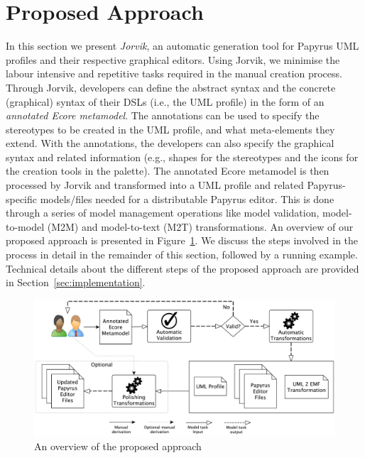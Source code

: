 \section{Proposed Approach}
\label{sec:approach}
In this section we present \textit{Jorvik}, an automatic generation tool for Papyrus UML profiles and their respective graphical editors.
Using Jorvik, we minimise the labour intensive and repetitive tasks required in the manual creation process.
Through Jorvik, developers can define the abstract syntax and the concrete (graphical) syntax of their DSLs (i.e., the UML profile) in the form of an \textit{annotated Ecore metamodel}.
The annotations can be used to specify the stereotypes to be created in the UML profile, and what meta-elements they extend. 
With the annotations, the developers can also specify the graphical syntax and related information (e.g., shapes for the stereotypes and the icons for the creation tools in the palette). 
The annotated Ecore metamodel is then processed by Jorvik and transformed into a UML profile and related Papyrus-specific models/files needed for a distributable Papyrus editor. This is done through a series of model management operations like model validation, model-to-model (M2M) and model-to-text (M2T) transformations. An overview of our proposed approach is presented in Figure~\ref{fig:approachOverview}. 
We discuss the steps involved in the process in detail in the remainder of this section, followed by a running example. 
Technical details about the different steps of the proposed approach are provided in Section~\ref{sec:implementation}.

\begin{figure}[ht!]
	\centering
	\includegraphics[width=1\textwidth]{diagrams/approachOverview.pdf}
	\caption[]{An overview of the proposed approach}
	\label{fig:approachOverview}
\end{figure}

